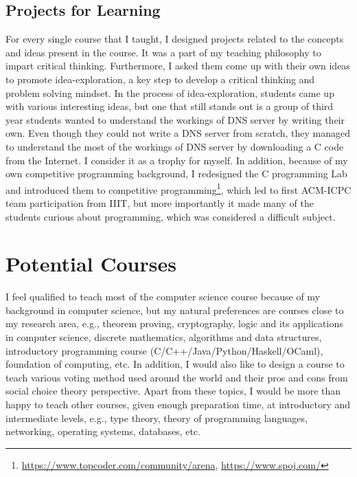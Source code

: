 \documentclass[a4paper]{article}
\begin{document}
\subsection{Projects for Learning}
For every single course that I taught, I designed projects related to the concepts 
and ideas present in the course. It was a part of my teaching philosophy to impart 
critical thinking. Furthermore, I asked them come up with their own ideas to 
promote idea-exploration, a key step to develop a critical thinking and problem solving mindset. 
In the process of idea-exploration, students came up with various interesting 
ideas, but one that still stands out is a group of third year students wanted 
to understand the workings of DNS server by writing their own. Even though they 
could not write a DNS server from scratch, they managed to understand the 
most of the workings of DNS server by downloading a C code from the Internet. 
I consider it as a trophy for myself. In addition, because of my own 
competitive programming background, 
I redesigned the C programming Lab and introduced them to competitive 
programming\footnote{\url{https://www.topcoder.com/community/arena}, 
\url{https://www.spoj.com/}}, which led to first ACM-ICPC team participation 
from IIIT, but more importantly it made many of the students curious about 
programming, which was considered a difficult subject.

\section{Potential Courses}
I feel qualified to teach most of the computer science course 
because of my background in computer science, but 
my natural preferences are courses close to my research 
area, e.g., theorem proving, cryptography, logic 
and its applications in computer science, discrete 
mathematics, algorithms and data structures, 
introductory programming course (C/C++/Java/Python/Haskell/OCaml),
foundation of computing, etc. 
In addition, I would also like to design a course to teach 
various voting method used around the world and 
their pros and cons from social choice theory perspective. 
Apart from these topics, I would 
be more than happy to teach other courses, given enough 
preparation time, at introductory and 
intermediate levels, e.g., type theory, theory of programming 
languages, networking, operating systems, databases, etc.
\end{document}
